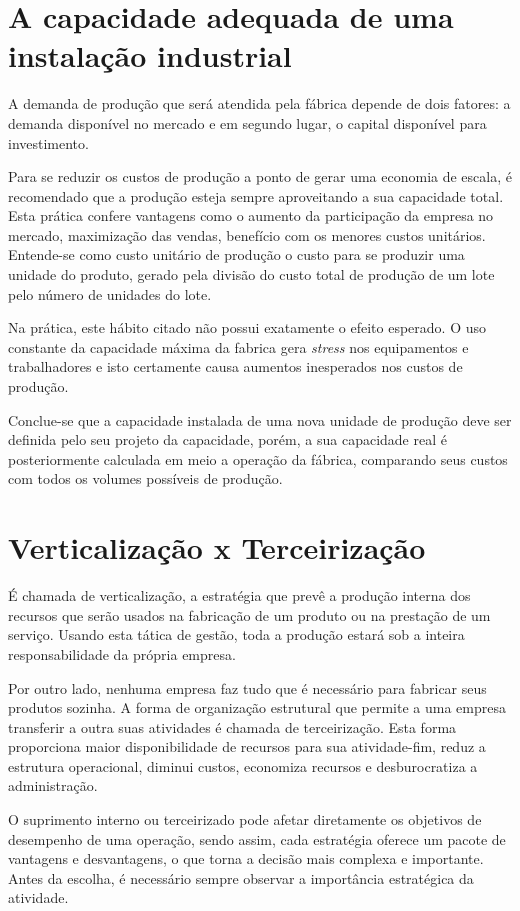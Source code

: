 \section{A capacidade adequada de uma instalação industrial}
A demanda de produção que será atendida pela fábrica depende de dois fatores: a demanda disponível no mercado e em segundo lugar, o capital disponível para investimento.

Para se reduzir os custos de produção a ponto de gerar uma economia de escala, é recomendado que a produção esteja sempre aproveitando a sua capacidade total. Esta prática confere vantagens como o aumento da participação da empresa no mercado, maximização das vendas, benefício com os menores custos unitários. Entende-se como custo unitário de produção o custo para se produzir uma unidade do produto, gerado pela divisão do custo total de produção de um lote pelo número de unidades do lote.

Na prática, este hábito citado não possui exatamente o efeito esperado. O uso constante da capacidade máxima da fabrica gera \textit{stress} nos equipamentos e trabalhadores e isto certamente causa aumentos inesperados nos custos de produção.

Conclue-se que a capacidade instalada de uma nova unidade de produção deve ser definida pelo seu projeto da capacidade, porém, a sua capacidade real é posteriormente calculada em meio a operação da fábrica, comparando seus custos com todos os volumes possíveis de produção.

\section{Verticalização x Terceirização}
É chamada de verticalização, a estratégia que prevê a produção interna dos recursos que serão usados na fabricação de um produto ou na prestação de um serviço. Usando esta tática de gestão, toda a produção estará sob a inteira responsabilidade da própria empresa.

Por outro lado, nenhuma empresa faz tudo que é necessário para fabricar seus produtos sozinha. A forma de organização estrutural que permite a uma empresa transferir a outra suas atividades é chamada de terceirização. Esta forma proporciona maior disponibilidade de recursos para sua atividade-fim, reduz a estrutura operacional, diminui custos, economiza recursos e desburocratiza a administração.

\par O suprimento interno ou terceirizado pode afetar diretamente os objetivos de desempenho de uma operação, sendo assim, cada estratégia oferece um pacote de vantagens e desvantagens, o que torna a decisão mais complexa e importante. Antes da escolha, é necessário sempre observar a importância estratégica da atividade.


